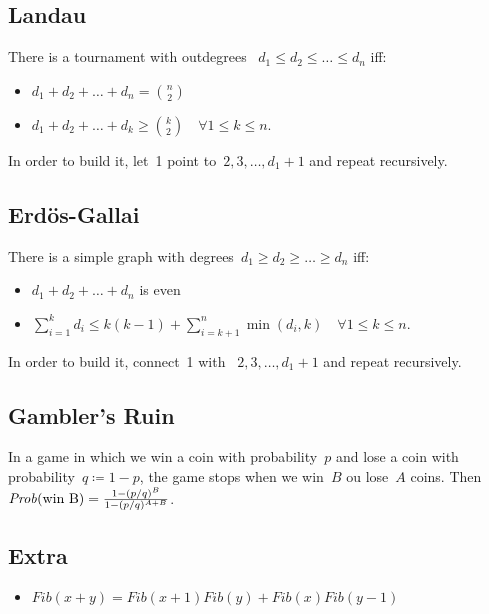 \subsection{Landau}
There is a tournament with outdegrees ~$d_1 \leq d_2 \leq \ldots \leq d_n$ iff:
\begin{itemize}
\item $d_1 + d_2 + \ldots + d_n = {n \choose 2}$
\item $d_1 + d_2 + \ldots + d_k \geq {k \choose 2} \quad \forall 1 \leq k \leq n.$
\end{itemize}
In order to build it, let~1 point to~$2, 3, \ldots, d_1 + 1$ and repeat recursively.

\subsection{Erdös-Gallai}
There is a simple graph with degrees~$d_1 \geq d_2 \geq \ldots \geq d_n$ iff:
\begin{itemize}
\item $d_1 + d_2 + \ldots + d_n$ is even
\item $\sum\limits_{i = 1}^k{d_i} \leq k(k-1) + \sum\limits_{i=k+1}^n{\min(d_i, k)} \quad \forall 1 \leq k \leq n$.
\end{itemize}
In order to build it, connect~1 with ~$2, 3, \ldots, d_1 + 1$ and repeat recursively.

\subsection{Gambler's Ruin}
In a game in which we win a coin with probability~$p$ and lose a coin with probability~$q \coloneqq 1 - p$, the game stops when we win~$B$ ou lose~$A$ coins. Then~$\mathit{Prob}(\textnormal{win B}) = \frac{1 - (p/q)^B}{1 - (p/q)^{A+B}}$.

\subsection{Extra}
\newcommand{\Fib}{\mathit{Fib}}
\begin{itemize}
\item $\Fib(x + y) = \Fib(x + 1) \Fib(y) + \Fib(x) \Fib(y - 1)$
\end{itemize}
